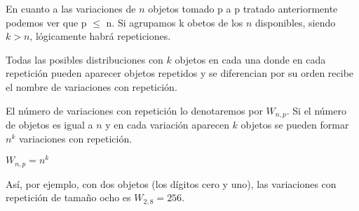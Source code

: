 En cuanto a las variaciones de $n$ objetos tomado p a p tratado anteriormente podemos
ver que p $\leq$ n. Si agrupamos k obetos de los $n$ disponibles, siendo $k>n$, lógicamente habrá repeticiones.

Todas las posibles distribuciones con $k$ objetos en cada una donde en cada repetición
pueden aparecer objetos repetidos y se diferencian por su orden recibe el nombre de
variaciones con repetición.

El número de variaciones con repetición lo denotaremos por $W_{n,p}$. Si el número de objetos es igual a $n$ y en cada variación aparecen $k$ objetos se pueden formar $n^{k}$ variaciones con repetición.

$W_{n,p}=n^{k}$

Así, por ejemplo, con dos objetos (los dígitos cero y uno), las variaciones con
repetición de tamaño ocho es $W_{2,8}=256$.